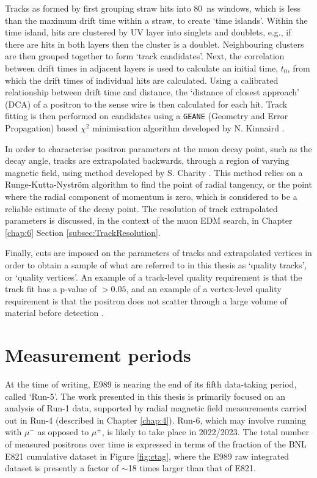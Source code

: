 Tracks as formed by first grouping straw hits into \SI{80}{\nano\second} windows, which is less than the maximum drift time within a straw, to create `time islands'. Within the time island, hits are clustered by UV layer into singlets and doublets, e.g., if there are hits in both layers then the cluster is a doublet. Neighbouring clusters are then grouped together to form `track candidates'. Next, the correlation between drift times in adjacent layers is used to calculate an initial time, $t_{0}$, from which the drift times of individual hits are calculated. Using a calibrated relationship between drift time and distance, the `distance of closest approach' (DCA) of a positron to the sense wire is then calculated for each hit. Track fitting is then performed on candidates using a \texttt{GEANE} (Geometry and Error Propagation) \cite{GEANE} based $\chi^{2}$ minimisation algorithm developed by N. Kinnaird \cite{Kinnaird}. 

In order to characterise positron parameters at the muon decay point, such as the decay angle, tracks are extrapolated backwards, through a region of varying magnetic field, using method developed by S. Charity \cite{Charity}. This method relies on a Runge-Kutta-Nyström algorithm \cite{Runge} to find the point of radial tangency, or the point where the radial component of momentum is zero, which is considered to be a reliable estimate of the decay point. The resolution of track extrapolated parameters is discussed, in the context of the muon EDM search, in Chapter \ref{chap:6} Section \ref{subsec:TrackResolution}.

Finally, cuts are imposed on the parameters of tracks and extrapolated vertices in order to obtain a sample of what are referred to in this thesis as `quality tracks', or `quality vertices'. An example of a track-level quality requirement is that the track fit has a p-value of $>0.05$, and an example of a vertex-level quality requirement is that the positron does not scatter through a large volume of material before detection \cite{TrackQuality}.

\section{Measurement periods}\label{sec:MeasPeriods}

At the time of writing, E989 is nearing the end of its fifth data-taking period, called `Run-5'. The work presented in this thesis is primarily focused on an analysis of Run-1 data, supported by radial magnetic field measurements carried out in Run-4 (described in Chapter \ref{chap:4}). Run-6, which may involve running with $\mu^{-}$ as opposed to $\mu^{+}$, is likely to take place in 2022/2023. The total number of measured positrons over time is expressed in terms of the fraction of the BNL E821 cumulative dataset in Figure \ref{fig:ctag}, where the E989 raw integrated dataset is presently a factor of $\sim$18 times larger than that of E821. 

